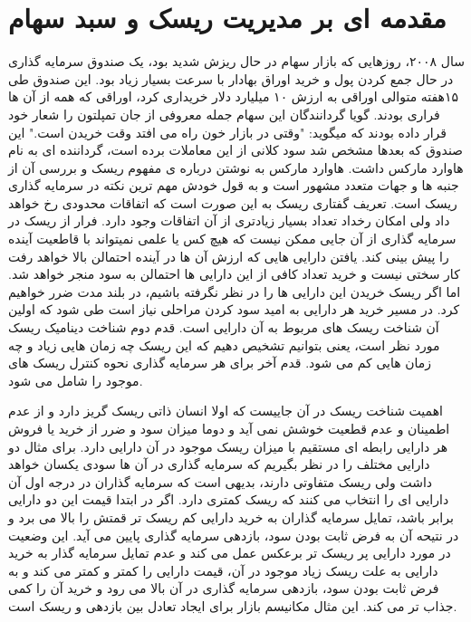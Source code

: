 \documentclass[a4paper,titlepage,12pt,fleqn,oneside]{report}
\begin{document}
	\section{مقدمه ای بر مدیریت ریسک و سبد سهام}
	سال ۲۰۰۸، روزهایی که بازار سهام در حال ریزش شدید بود، یک صندوق سرمایه گذاری در حال جمع کردن پول و خرید اوراق بهادار با سرعت بسیار زیاد بود. این صندوق طی ۱۵هفته متوالی اوراقی به ارزش ۱۰ میلیارد دلار خریداری کرد، اوراقی که همه از آن ها فراری بودند. گویا گردانندگان این سهام جمله معروفی از جان تمپلتون را شعار خود قرار داده بودند که میگوید: "وقتی در بازار خون راه می افتد وقت خریدن است."
	این صندوق که بعدها مشخص شد سود کلانی از این معاملات برده است، گرداننده ای به نام هاوارد مارکس داشت. هاوارد مارکس به نوشتن درباره ی مفهوم ریسک و بررسی آن از جنبه ها و جهات متعدد مشهور است و به قول خودش مهم ترین نکته در سرمایه گذاری ریسک است.  تعریف گفتاری ریسک به این صورت است که اتفاقات محدودی رخ خواهد داد ولی امکان رخداد تعداد بسیار زیادتری از آن اتفاقات وجود دارد. فرار از ریسک در سرمایه گذاری از آن جایی ممکن نیست که هیچ کس یا علمی نمیتواند با قاطعیت آینده را پیش بینی کند. یافتن دارایی هایی که ارزش آن ها در آینده احتمالن بالا خواهد رفت کار سختی نیست و خرید تعداد کافی از این دارایی ها احتمالن به سود منجر خواهد شد. اما اگر ریسک خریدن این دارایی ها را در نظر نگرفته باشیم، در بلند مدت ضرر خواهیم کرد.   در مسیر خرید هر دارایی به امید سود کردن مراحلی نیاز است طی شود که اولین آن شناخت ریسک های مربوط به آن دارایی است. قدم دوم شناخت دینامیک ریسک مورد نظر است، یعنی بتوانیم تشخیص دهیم که این ریسک چه زمان هایی زیاد و چه زمان هایی کم می شود. قدم آخر برای هر سرمایه گذاری نحوه کنترل ریسک های موجود را شامل می شود. 
	
	اهمیت شناخت ریسک در آن جاییست که اولا انسان ذاتی ریسک گریز دارد و از عدم اطمینان و عدم قطعیت خوشش نمی آید و دوما میزان سود و ضرر از خرید یا فروش هر دارایی رابطه ای مستقیم با میزان ریسک موجود در آن دارایی دارد. برای مثال دو دارایی مختلف را در نظر بگیریم که سرمایه گذاری در آن ها سودی یکسان خواهد داشت ولی ریسک متفاوتی دارند، بدیهی است که سرمایه گذاران در درجه اول آن دارایی ای را انتخاب می کنند که ریسک کمتری دارد. اگر در ابتدا قیمت این دو دارایی برابر باشد، تمایل سرمایه گذاران به خرید دارایی کم ریسک تر قمتش را بالا می برد و در نتیحه آن به فرض ثابت بودن سود، بازدهی سرمایه گذاری پایین می آید. این وضعیت در مورد دارایی پر ریسک تر برعکس عمل می کند و عدم تمایل سرمایه گذار به خرید دارایی به علت ریسک زیاد موجود در آن، قیمت دارایی را کمتر و کمتر می کند و به فرض ثابت بودن سود،  بازدهی سرمایه گذاری در آن بالا می رود و خرید آن را کمی جذاب تر می کند.  این مثال مکانیسم بازار برای ایجاد تعادل بین بازدهی و ریسک است. 
	
\end{document}
